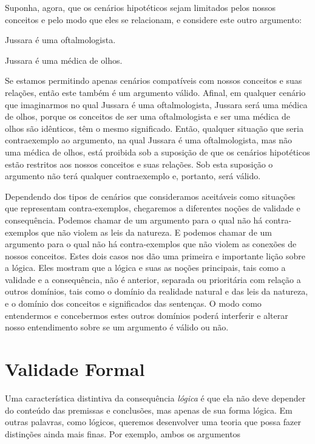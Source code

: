 Suponha, agora, que os cenários hipotéticos sejam limitados pelos nossos conceitos e pelo modo que eles se relacionam, e considere este outro argumento:
	\begin{earg}
		\item[] Jussara é uma oftalmologista.
		\item[\therefore] Jussara é uma médica de olhos.
	\end{earg}
Se estamos permitindo apenas cenários compatíveis com nossos conceitos e suas relações, então este também é um argumento válido.
Afinal, em qualquer cenário que imaginarmos no qual Jussara é uma oftalmologista, Jussara será uma médica de olhos, porque os conceitos de ser uma oftalmologista e ser uma médica de olhos são idênticos, têm o mesmo significado.
Então, qualquer situação que seria contraexemplo ao argumento, na qual Jussara é uma oftalmologista, mas não uma médica de olhos, está proibida sob a suposição de que os cenários hipotéticos estão restritos aos nossos conceitos e suas relações.
Sob esta suposição o argumento não terá qualquer contraexemplo e, portanto, será válido.

Dependendo dos tipos de cenários que consideramos aceitáveis como situações que representam contra-exemplos, chegaremos a diferentes noções de validade e consequência.
Podemos chamar de  um argumento para o qual não há contra-exemplos que não violem as leis da natureza.
E podemos chamar de  um argumento para o qual não há contra-exemplos que não violem as conexões de nossos conceitos.
Estes dois casos nos dão uma primeira e importante lição sobre a lógica.
Eles mostram que a lógica e suas as noções principais, tais como a validade e a consequência, não é anterior, separada ou prioritária com relação a outros domínios, tais como o domínio da realidade natural e das leis da natureza, e o domínio dos conceitos e significados das sentenças.
O modo como entendermos e concebermos estes outros domínios poderá interferir e alterar nosso entendimento sobre se um argumento é válido ou não.


\section{Validade Formal}

Uma característica distintiva da consequência \emph{lógica} é que ela não deve depender do conteúdo das premissas e conclusões, mas apenas de sua forma lógica.
Em outras palavras, como lógicos, queremos desenvolver uma teoria que possa fazer distinções ainda mais finas. Por exemplo, ambos os argumentos

